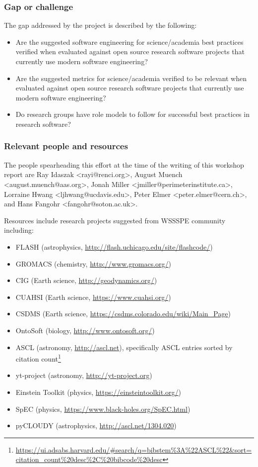 \subsubsection{Gap or challenge}

The gap addressed by the project is described by the following:
\begin{itemize}
\item Are the suggested software engineering for science/academia best practices verified when evaluated against open source research software projects that currently use modern software engineering?
\item Are the suggested metrics for science/academia verified to be relevant when evaluated against open source research software projects that currently use modern software engineering?
\item Do research groups have role models to follow for successful best practices in research software?
\end{itemize}

\subsubsection{Relevant people and resources}

The people spearheading this effort at the time of the writing of this workshop report are Ray Idaszak <rayi@renci.org>, August Muench <august.muench@aas.org>, Jonah Miller <jmiller@perimeterinstitute.ca>, Lorraine Hwang <ljhwang@ucdavis.edu>, Peter Elmer <peter.elmer@cern.ch>, and Hans Fangohr <fangohr@soton.ac.uk>. 

\noindent
Resources include research projects suggested from WSSSPE community including:
\begin{itemize}
\item FLASH (astrophysics, \url{http://flash.uchicago.edu/site/flashcode/})
\item GROMACS (chemistry, \url{http://www.gromacs.org/})
\item CIG (Earth science, \url{http://geodynamics.org/})
\item CUAHSI (Earth science, \url{https://www.cuahsi.org/})
\item CSDMS (Earth science, \url{https://csdms.colorado.edu/wiki/Main_Page})
\item OntoSoft (biology, \url{http://www.ontosoft.org/})
\item ASCL (astronomy, \url{http://ascl.net}), specifically ASCL entries sorted by citation count\footnote{\url{https://ui.adsabs.harvard.edu/\#search/q=bibstem\%3A\%22ASCL\%22&sort=citation_count\%20desc\%2C\%20bibcode\%20desc}}
\item yt-project (astronomy,  \url{http://yt-project.org})
\item Einstein Toolkit (physics, \url{https://einsteintoolkit.org/})
\item SpEC (physics, \url{https://www.black-holes.org/SpEC.html})
\item pyCLOUDY (astrophysics, \url{http://ascl.net/1304.020})
\end{itemize}

